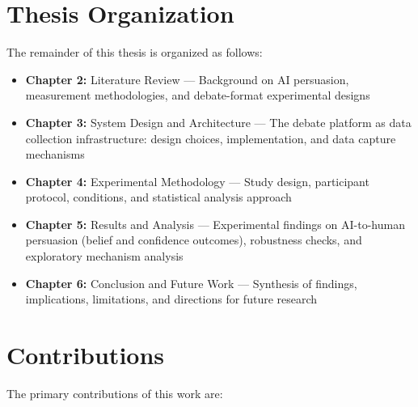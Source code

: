 \section{Thesis Organization}

The remainder of this thesis is organized as follows:

\begin{itemize}
    \item \textbf{Chapter 2:} Literature Review --- Background on AI persuasion, measurement
    methodologies, and debate-format experimental designs
    \item \textbf{Chapter 3:} System Design and Architecture --- The debate platform as data
    collection infrastructure: design choices, implementation, and data capture mechanisms
    \item \textbf{Chapter 4:} Experimental Methodology --- Study design, participant protocol,
    conditions, and statistical analysis approach
    \item \textbf{Chapter 5:} Results and Analysis --- Experimental findings on AI-to-human
    persuasion (belief and confidence outcomes), robustness checks, and exploratory mechanism analysis
    \item \textbf{Chapter 6:} Conclusion and Future Work --- Synthesis of findings, implications,
    limitations, and directions for future research
\end{itemize}

\section{Contributions}

The primary contributions of this work are:

